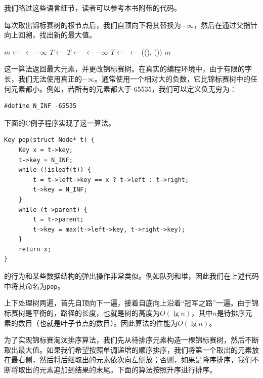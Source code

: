 \documentclass[b5paper]{ctexart}
\begin{document}
我们略过这些语言细节，读者可以参考本书附带的代码。

每次取出锦标赛树的根节点后，我们自顶向下将其替换为$-\infty$，然后在通过父指针向上回溯，找出新的最大值。

\begin{algorithmic}[1]
  \State $m \gets$ 
  \State {} $\gets -\infty$
    
      \State $T \gets$ 
    \Else
      \State $T \gets$ 
    \EndIf
    \State {} $\gets -\infty$
  \EndWhile
   
    \State $T \gets$ 
    \State {} $\gets$ ((), ())
  \EndWhile
  \State \Return $m$
\EndFunction
\end{algorithmic}

这一算法返回最大元素，并更改锦标赛树。在真实的编程环境中，由于有限的字长，我们无法使用真正的$-\infty$。通常使用一个相对大的负数，它比锦标赛树中的任何元素都小。例如，若所有的元素都大于-65535，我们可以定义负无穷为：

\lstset{language=C}
\begin{lstlisting}
#define N_INF -65535
\end{lstlisting}

下面的C例子程序实现了这一算法。

\lstset{language=C}
\begin{lstlisting}
Key pop(struct Node* t) {
    Key x = t->key;
    t->key = N_INF;
    while (!isleaf(t)) {
        t = t->left->key == x ? t->left : t->right;
        t->key = N_INF;
    }
    while (t->parent) {
        t = t->parent;
        t->key = max(t->left->key, t->right->key);
    }
    return x;
}
\end{lstlisting}

的行为和某些数据结构的弹出操作非常类似。例如队列和堆，因此我们在上述代码中将其命名为\texttt{pop}。

上下处理树两遍，首先自顶向下一遍，接着自底向上沿着“冠军之路”一遍。由于锦标赛树是平衡的，路径的长度，也就是树的高度为$O(\lg n)$，其中$n$是待排序元素的数目（也就是叶子节点的数目）。因此算法的性能为$O(\lg n)$。

为了实现锦标赛淘汰排序算法，我们先从待排序元素构造一棵锦标赛树，然后不断取出最大值。如果我们希望按照单调递增的顺序排序，我们将第一个取出的元素放在最右侧，然后将后继取出的元素依次向左侧放；否则，如果是降序排序，我们不断将取出的元素追加到结果的末尾。下面的算法按照升序进行排序。
\end{document}
